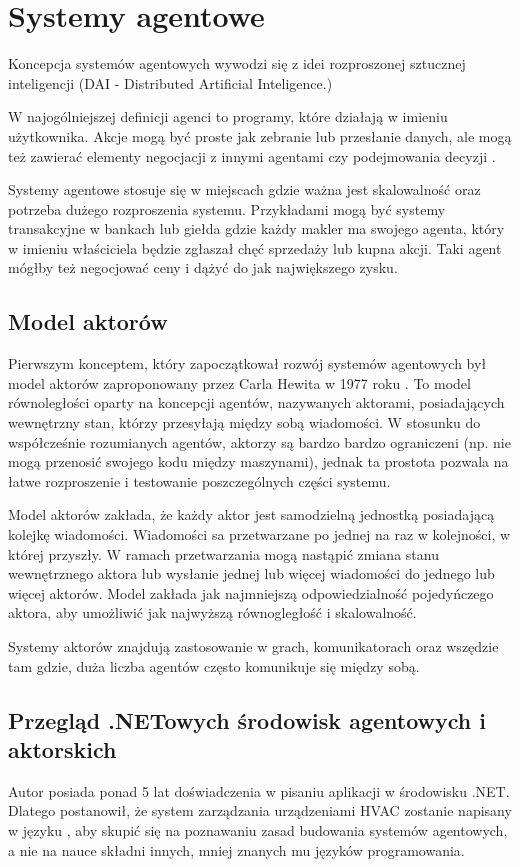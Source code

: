 \chapter{Systemy agentowe}
Koncepcja systemów agentowych wywodzi się z idei rozproszonej sztucznej inteligencji (DAI - Distributed Artificial Inteligence.)

W najogólniejszej definicji agenci to programy, które działają w imieniu użytkownika. 
Akcje mogą być proste jak zebranie lub przesłanie danych, ale mogą też zawierać elementy negocjacji z innymi agentami czy podejmowania decyzji \cite{bib:agenciNazewnictwo}. 

Systemy agentowe stosuje się w miejscach gdzie ważna jest skalowalność oraz potrzeba dużego rozproszenia systemu. 
Przykładami mogą być systemy transakcyjne w bankach lub giełda gdzie każdy makler ma swojego agenta, który w imieniu właściciela będzie zgłaszał chęć sprzedaży lub kupna akcji. Taki agent mógłby też negocjować ceny i dążyć do jak największego zysku.

\section{Model aktorów}
Pierwszym konceptem, który zapoczątkował rozwój systemów agentowych był model aktorów zaproponowany przez Carla Hewita w 1977 roku \cite{bib:agenciNazewnictwo}. 
To model równoległości oparty na koncepcji agentów, nazywanych aktorami, posiadających wewnętrzny stan, którzy przesyłają między sobą wiadomości. W stosunku do współcześnie rozumianych agentów, aktorzy są bardzo bardzo ograniczeni (np. nie mogą przenosić swojego kodu między maszynami), jednak ta prostota pozwala na łatwe rozproszenie i testowanie poszczególnych części systemu. 

Model aktorów zakłada, że każdy aktor jest samodzielną jednostką posiadającą kolejkę wiadomości. Wiadomości sa przetwarzane po jednej na raz w kolejności, w której przyszły. W ramach przetwarzania mogą nastąpić zmiana stanu wewnętrznego aktora lub wysłanie jednej lub więcej wiadomości do jednego lub więcej aktorów. Model zakłada jak najmniejszą odpowiedzialność pojedyńczego aktora, aby umożliwić jak najwyższą równogległość i skalowalność. 

Systemy aktorów znajdują zastosowanie w grach, komunikatorach oraz wszędzie tam gdzie, duża liczba agentów często komunikuje się między sobą. \cite{bib:akkaUseCases}

\section{Przegląd .NETowych środowisk agentowych i aktorskich}
Autor posiada ponad 5 lat doświadczenia w pisaniu aplikacji w środowisku .NET. 
Dlatego postanowił, że system zarządzania urządzeniami HVAC zostanie napisany w języku \csh, aby skupić się na poznawaniu zasad budowania systemów agentowych, a nie na nauce składni innych, mniej znanych mu języków programowania. 

